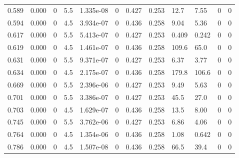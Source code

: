 \documentclass[preview]{standalone}
\begin{document}
{{\begin{tabular}{L{1.2cm}C{1.2cm} C{0.3cm}C{0.5cm} C{1.4cm}C{1.4cm} C{1.4cm}C{1.4cm} C{1.6cm}C{1.6cm} C{1.6cm}C{1.6cm}}
  0.589  &  0.000  & 0     & 5.5 &  1.335e-08  & 0  &  0.427&   0.253& 12.7 & 7.55   &  0 & 0  \\ 
  0.594  &  0.000  & 0     & 4.5 &  3.934e-07  & 0  &  0.436&   0.258& 9.04 & 5.36   &  0 & 0  \\ 
  0.617  &  0.000  & 0     & 5.5 &  5.413e-07  & 0  &  0.427&   0.253& 0.409 & 0.242   &  0 & 0  \\ 
  0.619  &  0.000  & 0     & 4.5 &  1.461e-07  & 0  &  0.436&   0.258& 109.6 & 65.0   &  0 & 0  \\ 
  0.631  &  0.000  & 0     & 5.5 &  9.371e-07  & 0  &  0.427&   0.253& 6.37 & 3.77   &  0 & 0  \\ 
  0.634  &  0.000  & 0     & 4.5 &  2.175e-07  & 0  &  0.436&   0.258& 179.8 & 106.6   &  0 & 0  \\ 
  0.669  &  0.000  & 0     & 5.5 &  2.396e-06  & 0  &  0.427&   0.253& 9.49 & 5.63   &  0 & 0  \\ 
  0.701  &  0.000  & 0     & 5.5 &  3.386e-07  & 0  &  0.427&   0.253& 45.5 & 27.0   &  0 & 0  \\ 
  0.703  &  0.000  & 0     & 4.5 &  1.629e-07  & 0  &  0.436&   0.258& 13.5 & 8.00   &  0 & 0  \\ 
  0.745  &  0.000  & 0     & 5.5 &  3.762e-06  & 0  &  0.427&   0.253& 6.86 & 4.06   &  0 & 0  \\ 
  0.764  &  0.000  & 0     & 4.5 &  1.354e-06  & 0  &  0.436&   0.258& 1.08 & 0.642   &  0 & 0  \\ 
  0.786  &  0.000  & 0     & 4.5 &  1.507e-08  & 0  &  0.436&   0.258& 66.5 & 39.4   &  0 & 0  \\ 
\hline 
\end{tabular} 

}}
\end{document}
